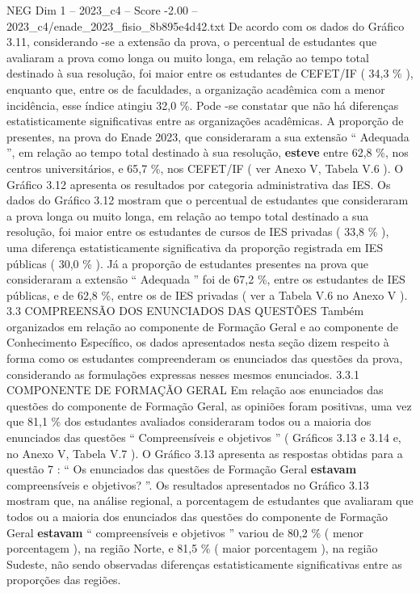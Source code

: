 \begin{textsample}{NEG Dim 1 – 2023\_c4 – Score -2.00 – 2023\_c4/enade\_2023\_fisio\_8b895e4d42.txt}
De acordo com os dados do Gráfico 3.11, considerando -se a extensão da prova, o percentual de estudantes que avaliaram a prova como longa ou muito longa, em relação ao tempo total destinado à sua resolução, foi maior entre os estudantes de CEFET/IF ( 34,3 \% ), enquanto que, entre os de faculdades, a organização acadêmica com a menor incidência, esse índice atingiu 32,0 \%.
Pode -se constatar que não há diferenças estatisticamente significativas entre as organizações acadêmicas.
A proporção de presentes, na prova do Enade 2023, que consideraram a sua extensão “ Adequada ”, em relação ao tempo total destinado à sua resolução, \textbf{esteve} entre 62,8 \%, nos centros universitários, e 65,7 \%, nos CEFET/IF ( ver Anexo V, Tabela V.6 ).
O Gráfico 3.12 apresenta os resultados por categoria administrativa das IES.
Os dados do Gráfico 3.12 mostram que o percentual de estudantes que consideraram a prova longa ou muito longa, em relação ao tempo total destinado a sua resolução, foi maior entre os estudantes de cursos de IES privadas ( 33,8 \% ), uma diferença estatisticamente significativa da proporção registrada em IES públicas ( 30,0 \% ).
Já a proporção de estudantes presentes na prova que consideraram a extensão “ Adequada ” foi de 67,2 \%, entre os estudantes de IES públicas, e de 62,8 \%, entre os de IES privadas ( ver a Tabela V.6 no Anexo V ). 3.3 COMPREENSÃO DOS ENUNCIADOS DAS QUESTÕES Também organizados em relação ao componente de Formação Geral e ao componente de Conhecimento Específico, os dados apresentados nesta seção dizem respeito à forma como os estudantes compreenderam os enunciados das questões da prova, considerando as formulações expressas nesses mesmos enunciados. 3.3.1 COMPONENTE DE FORMAÇÃO GERAL Em relação aos enunciados das questões do componente de Formação Geral, as opiniões foram positivas, uma vez que 81,1 \% dos estudantes avaliados consideraram todos ou a maioria dos enunciados das questões “ Compreensíveis e objetivos ” ( Gráficos 3.13 e 3.14 e, no Anexo V, Tabela V.7 ).
O Gráfico 3.13 apresenta as respostas obtidas para a questão 7 : “ Os enunciados das questões de Formação Geral \textbf{estavam} compreensíveis e objetivos? ”.
Os resultados apresentados no Gráfico 3.13 mostram que, na análise regional, a porcentagem de estudantes que avaliaram que todos ou a maioria dos enunciados das questões do componente de Formação Geral \textbf{estavam} “ compreensíveis e objetivos ” variou de 80,2 \% ( menor porcentagem ), na região Norte, e 81,5 \% ( maior porcentagem ), na região Sudeste, não sendo observadas diferenças estatisticamente significativas entre as proporções das regiões.

\end{textsample}
